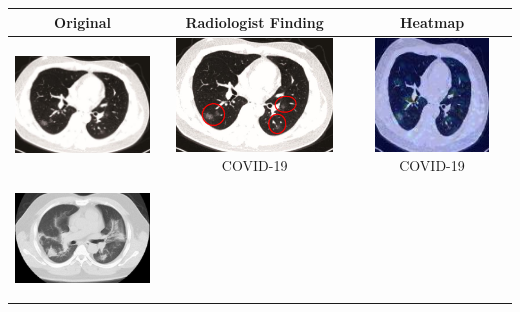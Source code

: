 \begin{longtable} { | c | c | c | }
    \hline
    \textbf{Original} & \textbf{Radiologist Finding} & \textbf{Heatmap} \\ \hline
    \begin{minipage}{.3\textwidth}
    \vspace{1em}
      \includegraphics[width=\linewidth, height=30mm]{Images/ctOrig1.png}
    \vspace{0.5em}
    \end{minipage}
    &
  \begin{minipage}{.3\textwidth}
      \vspace{1em}
      \includegraphics[width=\linewidth, height=30mm]{Images/ctRadio1.png}
           \centering  COVID-19
               \vspace{0.5em}
    \end{minipage}
    & 
    \begin{minipage}{.3\textwidth}
        \vspace{1em}
      \includegraphics[width=\linewidth, height=30mm]{Images/ctHeatmap1.jpg}
      \centering COVID-19
          \vspace{0.5em}
    \end{minipage}
    \\ \hline
    \begin{minipage}{.3\textwidth}
    \vspace{1em}
      \includegraphics[width=\linewidth, height=30mm]{Images/ctOrig2.png}

\end{minipage}
\end{longtable}
